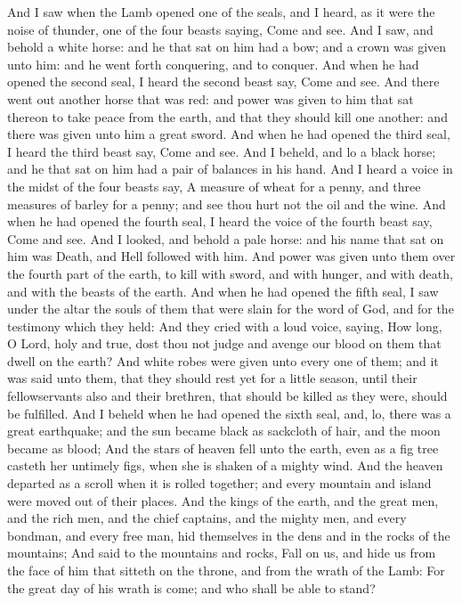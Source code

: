  And I saw when the Lamb opened one of the seals, and I
heard, as it were the noise of thunder, one of the four beasts saying,
Come and see.  And I saw, and behold a white horse: and he
that sat on him had a bow; and a crown was given unto him: and he went
forth conquering, and to conquer.  And when he had opened
the second seal, I heard the second beast say, Come and see.
 And there went out another horse that was red: and power
was given to him that sat thereon to take peace from the earth, and that
they should kill one another: and there was given unto him a great
sword.  And when he had opened the third seal, I heard the
third beast say, Come and see. And I beheld, and lo a black horse; and
he that sat on him had a pair of balances in his hand.  And
I heard a voice in the midst of the four beasts say, A measure of wheat
for a penny, and three measures of barley for a penny; and see thou hurt
not the oil and the wine.  And when he had opened the fourth
seal, I heard the voice of the fourth beast say, Come and see.
 And I looked, and behold a pale horse: and his name that
sat on him was Death, and Hell followed with him. And power was given
unto them over the fourth part of the earth, to kill with sword, and
with hunger, and with death, and with the beasts of the earth.
 And when he had opened the fifth seal, I saw under the
altar the souls of them that were slain for the word of God, and for the
testimony which they held:  And they cried with a loud
voice, saying, How long, O Lord, holy and true, dost thou not judge and
avenge our blood on them that dwell on the earth?  And
white robes were given unto every one of them; and it was said unto
them, that they should rest yet for a little season, until their
fellowservants also and their brethren, that should be killed as they
were, should be fulfilled.  And I beheld when he had opened
the sixth seal, and, lo, there was a great earthquake; and the sun
became black as sackcloth of hair, and the moon became as blood;
 And the stars of heaven fell unto the earth, even as a fig
tree casteth her untimely figs, when she is shaken of a mighty wind.
 And the heaven departed as a scroll when it is rolled
together; and every mountain and island were moved out of their places.
 And the kings of the earth, and the great men, and the
rich men, and the chief captains, and the mighty men, and every bondman,
and every free man, hid themselves in the dens and in the rocks of the
mountains;  And said to the mountains and rocks, Fall on
us, and hide us from the face of him that sitteth on the throne, and
from the wrath of the Lamb:  For the great day of his wrath
is come; and who shall be able to stand?

